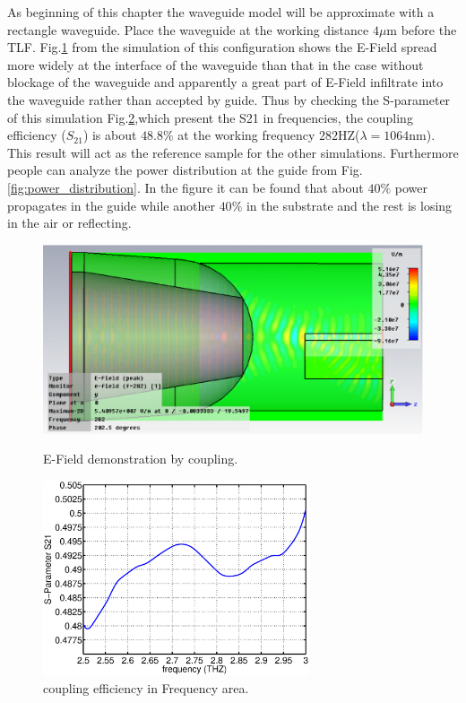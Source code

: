 As beginning of this chapter the waveguide model will be approximate with a rectangle waveguide. Place the waveguide at the working distance $4\mu$m before the TLF.  Fig.\quad\ref{fig:coupling_e_field} from the simulation of this configuration shows the E-Field spread more widely at the interface of the waveguide than that in the case without blockage of the waveguide and apparently a great part of E-Field infiltrate into the waveguide rather than accepted by guide. Thus by checking the S-parameter of this simulation Fig.\ref{fig:orignial_coupling_efficiency},which present the S21 in frequencies, the coupling efficiency ($S_{21}$) is about $48.8\%$ at the working frequency $282$HZ($\lambda=1064$nm). This result will act as the reference sample for the other simulations. Furthermore people can analyze the power distribution at the guide from Fig.\quad\ref{fig:power_distribution}. In the figure it can be found that about $40\%$ power propagates in the guide while another $40\%$ in the substrate and the rest is losing in the air or reflecting.
\begin{figure}[!ht]
\centering
	\includegraphics[width=0.7 \textwidth]{bilder/basic_waveguide_efield}
	\label{fig:coupling_e_field}
	\caption{E-Field demonstration by coupling.}
\end{figure}
\begin{figure}
\centering
\includegraphics[width=0.7\textwidth]{bilder/original_coupling_efficiency}
\caption{coupling efficiency in Frequency area.}
\label{fig:orignial_coupling_efficiency}
\end{figure}


